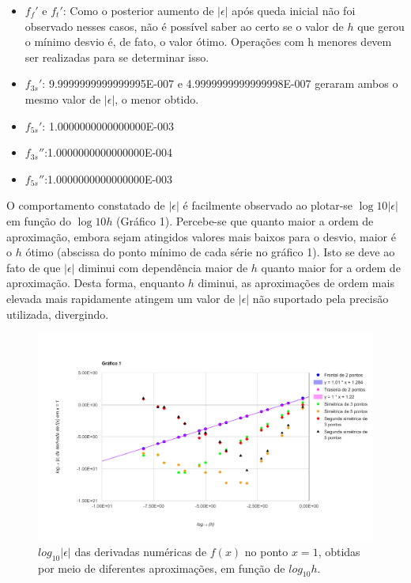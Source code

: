 \documentclass{article}
\begin{document}
\begin{itemize}
\item $f_f'$ e \(f_t'\): Como o posterior aumento de $|\epsilon|$ após queda inicial não foi observado nesses casos, não é possível saber ao certo se o valor de $h$ que gerou o mínimo desvio é, de fato, o valor ótimo. Operações com h menores devem ser realizadas para se determinar isso.
\item \(f_{3s}'\): 9.9999999999999995E-007 e 4.9999999999999998E-007 geraram ambos o mesmo valor de $|\epsilon|$, o menor obtido.
\item \(f_{5s}'\): 1.0000000000000000E-003
\item \(f_{3s}''\):1.0000000000000000E-004
\item \(f_{5s}''\):1.0000000000000000E-003
\end{itemize}

O comportamento constatado de $|\epsilon|$ é facilmente observado ao plotar-se $\log10{|\epsilon|}$ em função do $\log10{h}$ (Gráfico 1). Percebe-se que quanto maior a  ordem de aproximação, embora sejam atingidos valores mais baixos para o desvio, maior é o $h$ ótimo (abscissa do ponto mínimo de cada série no gráfico 1). Isto se deve ao fato de que $|\epsilon|$ diminui com dependência maior de $h$ quanto maior for a ordem de aproximação. Desta forma, enquanto $h$ diminui, as aproximações de ordem mais elevada mais rapidamente atingem um valor de $|\epsilon|$ não suportado pela precisão utilizada, divergindo.


\begin{figure}[h!]
  \centering
  \includegraphics[width=\textwidth]{graf1}
  \caption{$log_{10}|\epsilon|$ das derivadas numéricas de $f (x)$ no ponto $x = 1$, obtidas
por meio de diferentes aproximações, em função de $log_{10}h$.}
\label{fig:1}
\end{figure}
\end{document}
